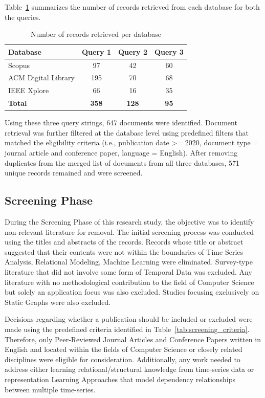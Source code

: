 Table~\ref{tab:records_per_database} summarizes the number of records retrieved from each database for both the queries.

\begin{table}[h]
\centering
\caption{Number of records retrieved per database}
\label{tab:records_per_database}
\begin{tabular}{lccc}
\hline
\textbf{Database} & \textbf{Query 1} & \textbf{Query 2} & \textbf{Query 3} \\
\hline
Scopus & 97 & 42 & 60 \\
ACM Digital Library & 195 & 70 & 68 \\
IEEE Xplore & 66 & 16 & 35 \\
\hline
\textbf{Total} & \textbf{358} & \textbf{128} & \textbf{95} \\
\hline
\end{tabular}
\end{table}

Using these three query strings, 647 documents were identified. Document retrieval was further filtered at the database level using predefined filters that matched the eligibility criteria (i.e., publication date >= 2020, document type = journal article and conference paper, language = English). After removing duplicates from the merged list of documents from all three databases, 571 unique records remained and were screened.

\subsection{Screening Phase}

During the Screening Phase of this research study, the objective was to identify non-relevant literature for removal. The initial screening process was conducted using the titles and abstracts of the records. Records whose title or abstract suggested that their contents were not within the boundaries of Time Series Analysis, Relational Modeling, Machine Learning were eliminated. Survey-type literature that did not involve some form of Temporal Data was excluded. Any literature with no methodological contribution to the field of Computer Science but solely an application focus was also excluded. Studies focusing exclusively on Static Graphs were also excluded.

Decisions regarding whether a publication should be included or excluded were made using the predefined criteria identified in Table~\ref{tab:screening_criteria}. Therefore, only Peer-Reviewed Journal Articles and Conference Papers written in English and located within the fields of Computer Science or closely related disciplines were eligible for consideration. Additionally, any work needed to address either learning relational/structural knowledge from time-series data or representation Learning Approaches that model dependency relationships between multiple time-series.

